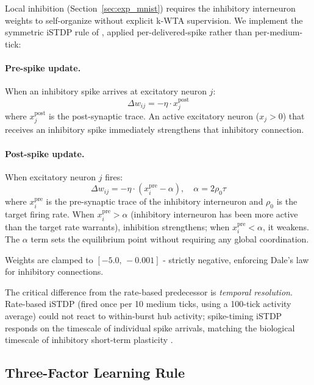 Local inhibition (Section~\ref{sec:exp_mnist}) requires the inhibitory interneuron weights to self-organize without explicit k-WTA supervision. We implement the symmetric iSTDP rule of \citet{vogels2011inhibitory}, applied per-delivered-spike rather than per-medium-tick:

\paragraph{Pre-spike update.} When an inhibitory spike arrives at excitatory neuron $j$:
\begin{equation}
  \Delta w_{ij} = -\eta \cdot x_j^{\text{post}}
\end{equation}
where $x_j^{\text{post}}$ is the post-synaptic trace. An active excitatory neuron ($x_j > 0$) that receives an inhibitory spike immediately strengthens that inhibitory connection.

\paragraph{Post-spike update.} When excitatory neuron $j$ fires:
\begin{equation}
  \Delta w_{ij} = -\eta \cdot (x_i^{\text{pre}} - \alpha), \quad \alpha = 2\rho_0\tau
\end{equation}
where $x_i^{\text{pre}}$ is the pre-synaptic trace of the inhibitory interneuron and $\rho_0$ is the target firing rate. When $x_i^{\text{pre}} > \alpha$ (inhibitory interneuron has been more active than the target rate warrants), inhibition strengthens; when $x_i^{\text{pre}} < \alpha$, it weakens. The $\alpha$ term sets the equilibrium point without requiring any global coordination.

Weights are clamped to $[-5.0,\,-0.001]$ - strictly negative, enforcing Dale's law for inhibitory connections.

The critical difference from the rate-based predecessor is \emph{temporal resolution}. Rate-based iSTDP (fired once per 10 medium ticks, using a 100-tick activity average) could not react to within-burst hub activity; spike-timing iSTDP responds on the timescale of individual spike arrivals, matching the biological timescale of inhibitory short-term plasticity \citep{vogels2011inhibitory}.

\subsection{Three-Factor Learning Rule}

